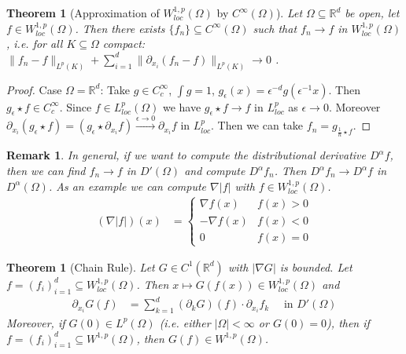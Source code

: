 \documentclass{report}
\theoremstyle{tommy}
\newtheorem{thm}[defn]{Theorem}
\newtheorem{rem}[defn]{Remark}
\begin{document}
  \begin{thm}[Approximation of \(W_{loc}^{1,p}(\Omega)\) by \(C^\infty(\Omega)\)]
    Let \(\Omega \subseteq \mathbb{R}^d\) be open, let \(f \in W_{loc}^{1,p}(\Omega)\). Then there exists \(\{f_n\} \subseteq C^\infty(\Omega)\) such that \(f_n \to f \) in \(W_{loc}^{1,p}(\Omega)\), i.e. for all \(K \subseteq \Omega\) compact: \(\|f_n - f\|_{L^p(K)} + \sum_{i=1}^d \| \partial_{x_i}(f_n - f)\|_{L^p(K)} \to 0\) .
  \end{thm}

  \begin{proof}
    Case \(\Omega = \mathbb{R}^d\): Take \(g \in C_c^\infty\), \(\int g = 1\), \(g_\epsilon(x) = \epsilon^{-d} g(\epsilon^{-1}x)\). Then \(g_\epsilon \star f \in C_c^\infty\). Since \(f \in L_{loc}^p(\Omega)\) we have \(g_\epsilon \star f \to f\) in \(L_{loc}^p\) as \(\epsilon \to 0\). Moreover \(\partial_{x_i} (g_\epsilon \star f) = (g_\epsilon \star \partial_{x_i} f)\xrightarrow{\epsilon \to 0} \partial_{x_i} f\) in \(L_{loc}^p\). Then we can take \(f_n = g_{\frac{1}{n} \star f}\).
  \end{proof}

  \begin{rem}
    In general, if we want to compute the distributional derivative \(D^\alpha f\), then we can find \(f_n \to f\) in \(D'(\Omega)\) and compute \(D^\alpha f_n\). Then \(D^\alpha f_n \to D^\alpha f\) in \(D^\alpha (\Omega)\). As an example we can compute \(\nabla |f|\) with \(f \in W_{loc}^{1,p}(\Omega)\).
    \begin{align*}
      (\nabla |f|)(x)
      &= \begin{cases}
        \nabla f(x) & f(x) > 0 \\
        - \nabla f(x) & f(x) < 0 \\
        0 & f(x) = 0
      \end{cases}
    \end{align*}
  \end{rem}
  
  \begin{thm}[Chain Rule]
    Let \(G \in C^1(\mathbb{R}^d)\) with \(|\nabla G|\) is bounded. Let \(f = (f_i)_{i=1}^d \subseteq W_{loc}^{1,p}(\Omega)\). Then \(x \mapsto G(f(x)) \in W_{loc}^{1,p}(\Omega)\) and
    \begin{align*}
      \partial_{x_i} G(f)
      &= \sum_{k=1}^d (\partial_k G)(f) \cdot \partial_{x_i} f_k \quad \text{ in } D'(\Omega)
    \end{align*}
    Moreover, if \(G(0) \in L^p(\Omega)\) (i.e. either \(|\Omega| < \infty\) or \(G(0) = 0\)), then if \(f = (f_i)_{i=1}^d \subseteq W^{1,p}(\Omega)\), then \(G(f) \in W^{1,p}(\Omega)\).
  \end{thm}
\end{document}
